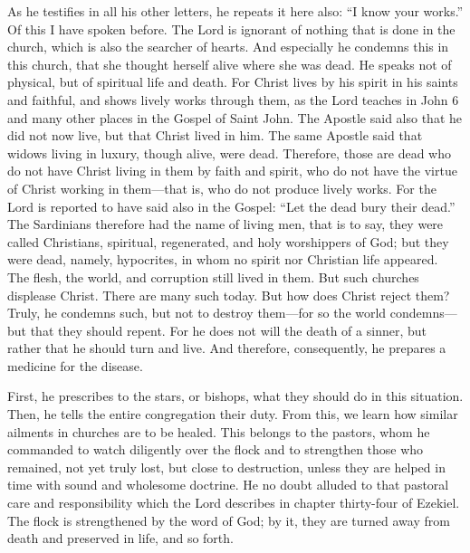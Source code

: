 As he testifies in all his other letters, he repeats it here also: “I know your works.” Of this I have spoken before. The Lord is ignorant of nothing that is done in the church, which is also the searcher of hearts. And especially he condemns this in this church, that she thought herself alive where she was dead. He speaks not of physical, but of spiritual life and death. For Christ lives by his spirit in his saints and faithful, and shows lively works through them, as the Lord teaches in John 6 and many other places in the Gospel of Saint John. The Apostle said also that he did not now live, but that Christ lived in him. The same Apostle said that widows living in luxury, though alive, were dead. Therefore, those are dead who do not have Christ living in them by faith and spirit, who do not have the virtue of Christ working in them—that is, who do not produce lively works. For the Lord is reported to have said also in the Gospel: “Let the dead bury their dead.” The Sardinians therefore had the name of living men, that is to say, they were called Christians, spiritual, regenerated, and holy worshippers of God; but they were dead, namely, hypocrites, in whom no spirit nor Christian life appeared. The flesh, the world, and corruption still lived in them. But such churches displease Christ. There are many such today. But how does Christ reject them? Truly, he condemns such, but not to destroy them—for so the world condemns—but that they should repent. For he does not will the death of a sinner, but rather that he should turn and live. And therefore, consequently, he prepares a medicine for the disease.

First, he prescribes to the stars, or bishops, what they should do in this situation. Then, he tells the entire congregation their duty. From this, we learn how similar ailments in churches are to be healed. This belongs to the pastors, whom he commanded to watch diligently over the flock and to strengthen those who remained, not yet truly lost, but close to destruction, unless they are helped in time with sound and wholesome doctrine. He no doubt alluded to that pastoral care and responsibility which the Lord describes in chapter thirty-four of Ezekiel. The flock is strengthened by the word of God; by it, they are turned away from death and preserved in life, and so forth.

